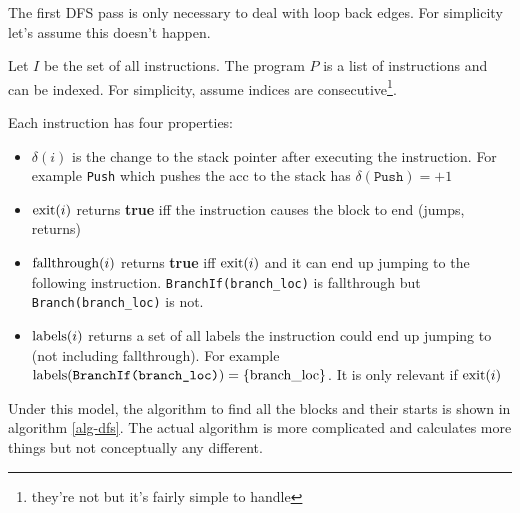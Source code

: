 The first DFS pass is only necessary to deal with loop back edges. For simplicity let's assume this
doesn't happen.

Let \(I\) be the set of all instructions. The program \(P\) is a list of instructions and can be
indexed. For simplicity, assume indices are consecutive\footnote{they're not but it's fairly simple
      to handle}.

Each instruction has four properties:

\begin{itemize}
      \item \(\delta(i)\) is the change to the stack pointer after executing the instruction. For
            example \texttt{Push} which pushes the acc to the stack has \(\delta(\texttt{Push}) =
            +1\)
      \item \(\operatorname{exit}(i)\) returns \textbf{true} iff the instruction causes the block to end
            (jumps, returns)
      \item \(\operatorname{fallthrough}(i)\) returns \textbf{true} iff \(\operatorname{exit}(i)\) and it can end up
            jumping to the following instruction. \texttt{BranchIf(branch\_loc)} is fallthrough but
            \texttt{Branch(branch\_loc)} is not.
      \item \(\operatorname{labels}(i)\) returns a set of all labels the instruction could end up jumping to
            (not
            including fallthrough). For example \(\operatorname{labels}(\texttt{BranchIf(branch\_loc)}) =
            \{\text{branch\_loc}\}\). It is only relevant if \(\operatorname{exit}(i)\)
\end{itemize}

Under this model, the algorithm to find all the blocks and their starts is shown in algorithm
\ref{alg-dfs}. The actual algorithm is more complicated and calculates more things but not
conceptually any different.

